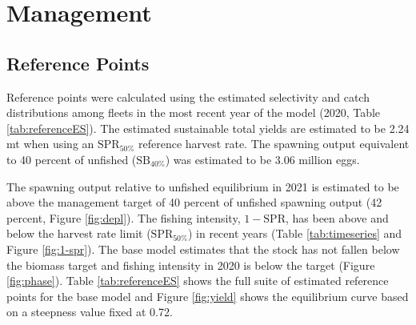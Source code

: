 \documentclass[11pt,
  english,
  a4paper,
]{article}
\begin{document}
\leavevmode\tagmcend\tagstructend\par

\clearpage


\hypertarget{management}{%
\section{Management}\label{management}}

\leavevmode\tagmcend\tagstructend


\hypertarget{reference-points}{%
\subsection{Reference Points}\label{reference-points}}

\leavevmode\tagmcend\tagstructend


Reference points were calculated using the estimated selectivity and catch distributions among fleets in the most recent year of the model (2020, Table \ref{tab:referenceES}). The estimated sustainable total yields are estimated to be 2.24 mt when using an {\(\text{SPR}_{50\%}\)\leavevmode\tagmcend\tagstructend} reference harvest rate. The spawning output equivalent to 40 percent of unfished ({\(\text{SB}_{40\%}\)\leavevmode\tagmcend\tagstructend}) was estimated to be 3.06 million eggs.

\leavevmode\tagmcend\tagstructend\par


The spawning output relative to unfished equilibrium in 2021 is estimated to be above the management target of 40 percent of unfished spawning output (42 percent, Figure \ref{fig:depl}). The fishing intensity, {\(1-\text{SPR}\)\leavevmode\tagmcend\tagstructend}, has been above and below the harvest rate limit ({\(\text{SPR}_{50\%}\)\leavevmode\tagmcend\tagstructend}) in recent years (Table \ref{tab:timeseries} and Figure \ref{fig:1-spr}). The base model estimates that the stock has not fallen below the biomass target and fishing intensity in 2020 is below the target (Figure \ref{fig:phase}). Table \ref{tab:referenceES} shows the full suite of estimated reference points for the base model and Figure \ref{fig:yield} shows the equilibrium curve based on a steepness value fixed at 0.72.
\end{document}
